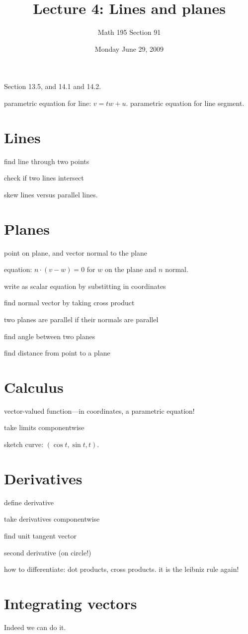 \documentclass[12pt]{article}
\title{Lecture 4: Lines and planes}
\author{Math 195 Section 91}
\date{Monday June 29, 2009}
\begin{document}
\maketitle

Section 13.5, and 14.1 and 14.2.

parametric equation for line: $v = t w + u$.  parametric equation for line segment.

\section{Lines}

find line through two points

check if two lines intersect

skew lines versus parallel lines.

\section{Planes}

point on plane, and vector normal to the plane

equation: $n \cdot (v - w) = 0$ for $w$ on the plane and $n$ normal.

write as scalar equation by substitting in coordinates

find normal vector by taking cross product

two planes are parallel if their normals are parallel

find angle between two planes

find distance from point to a plane

\section{Calculus}

vector-valued function---in coordinates, a parametric equation!

take limits componentwise

sketch curve: $(\cos t, \sin t, t)$.

\section{Derivatives}

define derivative

take derivatives componentwise

find unit tangent vector

second derivative (on circle!)

how to differentiate: dot products, cross products.  it is the leibniz rule again!

\section{Integrating vectors}

Indeed we can do it.
\end{document}
